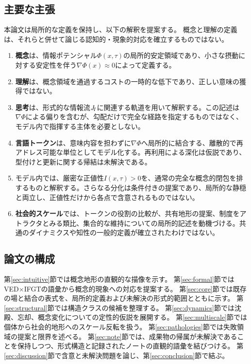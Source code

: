 \subsection{主要な主張}
本論文は局所的な定義を保持し、以下の解釈を提案する。
概念と理解の定義は、それらと併せて論じる認知的・現象的対応を確立するものではない。

\begin{enumerate}
\item \textbf{概念}は、情報ポテンシャル$\Phi(x,\tau)$の局所的安定領域であり、小さな摂動に対する安定性を伴う$\nabla\Phi(x)\approx 0$によって定義する。
\item \textbf{理解}は、概念領域を通過するコストの一時的な低下であり、正しい意味の獲得ではない。
\item \textbf{思考}は、形式的な情報流$J_{\!I}$に関連する軌道を用いて解釈する。この記述は$\nabla\Phi$による偏りを含むが、勾配だけで完全な経路を指定するものではなく、モデル内で指揮する主体を必要としない。
\item \textbf{言語トークン}は、意味内容を担わずに$\nabla\Phi$へ局所的に結合する、離散的で再アドレス可能な単位としてモデル化する。再利用による深化は仮説であり、型付けと更新に関する帰結は未解決である。
\item モデル内では、厳密な正値性$I(x,\tau)>0$を、通常の完全な概念的閉包を排するものと解釈する。さらなる分化は条件付きの提案であり、局所的な静穏と両立し、正値性だけから各点で含意されるものではない。
\item \textbf{社会的スケール}では、トークンの役割の比較が、共有地形の提案、制度をアトラクタとみる類比、集合的な維持についての局所的記述を動機づける。共通のダイナミクスや知性の一般的定義が確立されたわけではない。
\end{enumerate}

\subsection{論文の構成}
第\ref{sec:intuitive}節では概念地形の直観的な描像を示す。
第\ref{sec:formal}節ではVED$\times$IFGTの語彙から概念的現象への対応を提案する。
第\ref{sec:core}節では既存の場と結合の表式を、局所的定義および未解決の形式的範囲とともに示す。
第\ref{sec:structural}節では構造クラスの候補を整理する。
第\ref{sec:dynamics}節では沈殿、忘却、概念変化についての定性的仮説を展開する。
第\ref{sec:multiscale}節では個体から社会的地形へのスケール反転を扱う。
第\ref{sec:pathologies}節では失敗領域の提案と限界を述べる。
第\ref{sec:note}節では、成果物の帰属が未解決であることを保持しつつ、形式構造と記録されたノートの直観的語彙を結びつける。
第\ref{sec:discussion}節で含意と未解決問題を論じ、第\ref{sec:conclusion}節で結ぶ。
